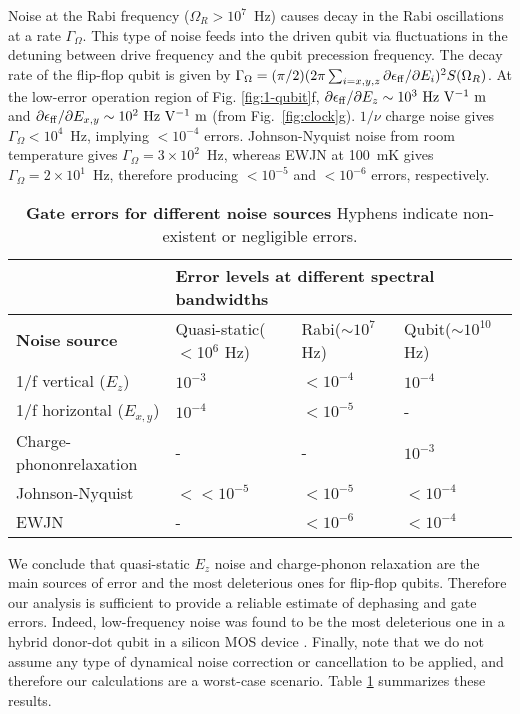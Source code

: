 Noise at the Rabi frequency ($\Omega_R>10^{7}$~Hz) causes decay in the Rabi oscillations at a rate $\Gamma_\Omega$. This type of noise feeds into the driven qubit via fluctuations in the detuning between drive frequency and the qubit precession frequency. The decay rate of the flip-flop qubit is given by $\Gamma_\Omega=(\pi/2)(2\pi\sum_{i=x,y,z}\partial\epsilon_{\rm ff}/\partial E_i)^2S(\Omega_R)$. At the low-error operation region of Fig. \ref{fig:1-qubit}f, $\partial\epsilon_{\rm ff}/\partial E_z\sim10^3~{\rm Hz~V^{-1}~m}$ and $\partial\epsilon_{\rm ff}/\partial E_{x,y}\sim10^2~{\rm Hz~V^{-1}~m}$ (from Fig.~\ref{fig:clock}g). $1/\nu$ charge noise gives $\Gamma_\Omega<10^4$~Hz, implying $<10^{-4}$ errors. Johnson-Nyquist noise from room temperature gives $\Gamma_\Omega=3\times10^2$~Hz, whereas EWJN at 100~mK gives $\Gamma_\Omega=2\times10^1$~Hz, therefore producing $<10^{-5}$ and $<10^{-6}$ errors, respectively.


\begin{table}
\centering
\begin{tabular}{|p{1.4in}|p{0.7in}|p{0.7in}|p{0.7in}|} \hline 
 & \multicolumn{3}{|p{2.0in}|}{\textbf{Error levels at different spectral bandwidths}} \\ \hline 
\textbf{Noise source} & Quasi-static\newline ($<$10${}^{6}$ Hz) & Rabi\newline ($\sim 10^{7}$ Hz) & Qubit\newline ($\sim 10^{10}$ Hz) \\ \hline 
1/f vertical ($E_z$) & $10^{-3}$ & $<10^{-4}$ & $10^{-4}$ \\ \hline 
1/f horizontal ($E_{x,y}$) & $10^{-4}$ & $<10^{-5}$ & - \\ \hline 
Charge-phonon\newline relaxation & - & - & $10^{-3}$ \\ \hline 
Johnson-Nyquist & $<<10^{-5}$ & $<10^{-5}$ & $<10^{-4}$ \\ \hline 
EWJN & - & $<10^{-6}$ & $<10^{-4}$  \\ \hline 
\end{tabular}
	\caption[Gate errors for different noise sources]{\textbf{Gate errors for different noise sources} Hyphens indicate non-existent or negligible errors.}
	\label{tab:noise}
\end{table}

We conclude that quasi-static $E_z$ noise and charge-phonon relaxation are the main sources of error and the most deleterious ones for flip-flop qubits. Therefore our analysis is sufficient to provide a reliable estimate of dephasing and gate errors. Indeed, low-frequency noise was found to be the most deleterious one in a hybrid donor-dot qubit in a silicon MOS device \cite{Harvey-Collard2015S}. Finally, note that we do not assume any type of dynamical noise correction or cancellation to be applied, and therefore our calculations are a worst-case scenario. Table \ref{tab:noise} summarizes these results. 

